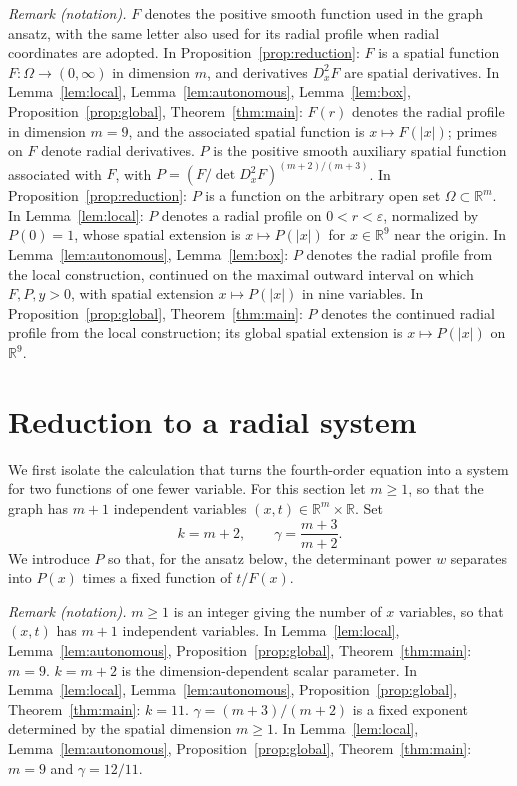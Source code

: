 \documentclass[11pt]{article}
\newcommand{\R}{\mathbb R}
\theoremstyle{remark}
\begin{document}
\noindent\textit{Remark (notation).} $F$ denotes the positive smooth function used in the graph ansatz, with the same letter also used for its radial profile when radial coordinates are adopted. In Proposition~\ref{prop:reduction}: $F$ is a spatial function $F:\Omega\to(0,\infty)$ in dimension $m$, and derivatives $D_x^2F$ are spatial derivatives. In Lemma~\ref{lem:local}, Lemma~\ref{lem:autonomous}, Lemma~\ref{lem:box}, Proposition~\ref{prop:global}, Theorem~\ref{thm:main}: $F(r)$ denotes the radial profile in dimension $m=9$, and the associated spatial function is $x\mapsto F(|x|)$; primes on $F$ denote radial derivatives. $P$ is the positive smooth auxiliary spatial function associated with $F$, with $P=(F/\det D_x^2F)^{(m+2)/(m+3)}$. In Proposition~\ref{prop:reduction}: $P$ is a function on the arbitrary open set $\Omega\subset\R^m$. In Lemma~\ref{lem:local}: $P$ denotes a radial profile on $0<r<\varepsilon$, normalized by $P(0)=1$, whose spatial extension is $x\mapsto P(|x|)$ for $x\in\R^9$ near the origin. In Lemma~\ref{lem:autonomous}, Lemma~\ref{lem:box}: $P$ denotes the radial profile from the local construction, continued on the maximal outward interval on which $F,P,y>0$, with spatial extension $x\mapsto P(|x|)$ in nine variables. In Proposition~\ref{prop:global}, Theorem~\ref{thm:main}: $P$ denotes the continued radial profile from the local construction; its global spatial extension is $x\mapsto P(|x|)$ on $\R^9$.


\section{Reduction to a radial system}\label{sec:reduction}
We first isolate the calculation that turns the fourth-order
equation into a system for two functions of one fewer variable.
For this section let $m\geq1$, so that the graph has $m+1$
independent variables $(x,t)\in\R^m\times\R$.  Set
\[
 k=m+2,\qquad \gamma=\frac{m+3}{m+2}.
\]
We introduce $P$ so that, for the ansatz below, the determinant power
$w$ separates into $P(x)$ times a fixed function of $t/F(x)$.

\noindent\textit{Remark (notation).} $m\geq1$ is an integer giving the number of $x$ variables, so that $(x,t)$ has $m+1$ independent variables. In Lemma~\ref{lem:local}, Lemma~\ref{lem:autonomous}, Proposition~\ref{prop:global}, Theorem~\ref{thm:main}: $m=9$. $k=m+2$ is the dimension-dependent scalar parameter. In Lemma~\ref{lem:local}, Lemma~\ref{lem:autonomous}, Proposition~\ref{prop:global}, Theorem~\ref{thm:main}: $k=11$. $\gamma=(m+3)/(m+2)$ is a fixed exponent determined by the spatial dimension $m\geq1$. In Lemma~\ref{lem:local}, Lemma~\ref{lem:autonomous}, Proposition~\ref{prop:global}, Theorem~\ref{thm:main}: $m=9$ and $\gamma=12/11$.
\end{document}
